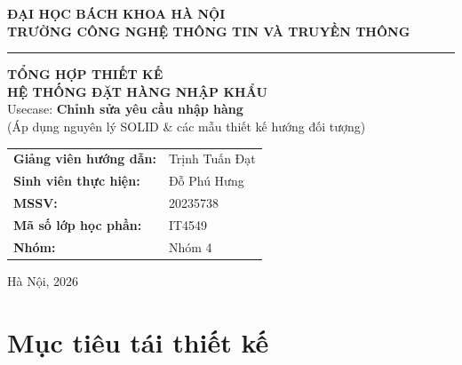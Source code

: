 \documentclass[12pt,a4paper]{article}
\newcommand{\svName}{Đỗ Phú Hưng}
\newcommand{\svMSSV}{20235738}
\newcommand{\svGVHD}{Trịnh Tuấn Đạt}
\newcommand{\svHP}{IT4549}
\newcommand{\svNhom}{Nhóm 4}
\begin{document}
\begin{titlepage}
\centering
\thispagestyle{empty}

{\large \textbf{ĐẠI HỌC BÁCH KHOA HÀ NỘI}}\\[2pt]
{\large \textbf{TRƯỜNG CÔNG NGHỆ THÔNG TIN VÀ TRUYỀN THÔNG}}\\[6pt]
\rule{\textwidth}{0.8pt}

\vspace{1.2cm}

\vspace{0.8cm}
{\Huge \textbf{TỔNG HỢP THIẾT KẾ}}\\[10pt]
{\LARGE \textbf{HỆ THỐNG ĐẶT HÀNG NHẬP KHẨU}}\\[18pt]
{\Large Usecase: \textbf{Chỉnh sửa yêu cầu nhập hàng}}\\[6pt]
{\large (Áp dụng nguyên lý SOLID \& các mẫu thiết kế hướng đối tượng)}

\vspace{1.6cm}
\begin{flushleft}\large
\hspace{1.5cm}
\begin{tabular}{@{}ll@{}}
\textbf{Giảng viên hướng dẫn:} & \svGVHD \\[8pt]
\textbf{Sinh viên thực hiện:}  & \svName \\[8pt]
\textbf{MSSV:}                 & \svMSSV \\[8pt]
\textbf{Mã số lớp học phần:}   & \svHP \\[8pt]
\textbf{Nhóm:}                 & \svNhom \\
\end{tabular}
\end{flushleft}

\vfill
{\large Hà Nội, 2026}
\end{titlepage}

\tableofcontents
\thispagestyle{empty}
\newpage
\setcounter{page}{1}

\section{Mục tiêu tái thiết kế}
\end{document}
